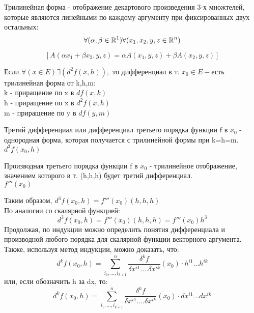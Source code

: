 \begin{opred}
Трилинейная форма - отображение декартового произведения 3-х множтелей, которые являются линейными по каждому аргументу при фиксированных двух остальных:
$$
\forall(\alpha,\beta\in\mathbb{R}^1)\forall(x_1,x_2,y,z\in\mathbb{R}^n)
$$

$$
[A(\alpha x_1+\beta x_2,y,z) = \alpha A(x_1,y,z)+\beta A(x_2,y,z)]
$$
\end{opred}
Если $\forall(x\in E)\exists(d^2 f(x,h)),$ то дифференциал в т. $x_0\in E - $есть трилинейная форма от k,h,m:
\\
	k - приращение по x в $df(x,k)$
	\\
	h - приращение по x в $d^2 f(x,h)$
	\\
	m - приращение по y в $df(y,m)$
\\
\begin{opred}
Третий дифференциал или дифференциал третьего порядка функции f в $x_0$ - однородная форма, которая получается с трилинейной формы при k=h=m.
\\
$d^3 f(x_0,h)$
\end{opred}

\begin{opred}
Производная третьего порядка функции f в $x_0$ - трилинейное отображение, значением которого в т. (h,h,h) будет третий дифференциал.
\\
$f'''(x_0)$
\end{opred}
Таким образом, $d^3 f(x_0,h)=f'''(x_0)(h,h,h)$
\\
По аналогии со скалярной функцией:
$$
d^3 f(x_0,h) = f'''(x_0)(h,h,h)= f'''(x_0)h^3
$$
Продолжая, по индукции можно определить понятия дифференциала и производной любого порядка для скалярной функции векторного аргумента. Также, используя метод индукции, можно доказать, что:
$$
d^k f(x_0,h)=\sum_{i_1,...,i_{k+1}}^{n}\frac{\delta^k f}{\delta x^{i1}....\delta x^{ik}}(x_0)\cdot h^{i1}...h^{ik}
$$
или, если обозначить h за dx, то:
$$
d^k f(x_0,h)=\sum_{i_1,...,i_{k+1}}^{n}\frac{\delta^k f}{\delta x^{i1}....\delta x^{ik}}(x_0)\cdot dx^{i1}...dx^{ik}
$$

